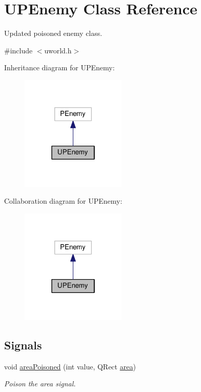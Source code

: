 \hypertarget{classUPEnemy}{}\section{U\+P\+Enemy Class Reference}
\label{classUPEnemy}


Updated poisoned enemy class.  




{\ttfamily \#include $<$uworld.\+h$>$}



Inheritance diagram for U\+P\+Enemy\+:
\nopagebreak
\begin{figure}[H]
\begin{center}
\leavevmode
\includegraphics[width=142pt]{da/dff/classUPEnemy__inherit__graph}
\end{center}
\end{figure}


Collaboration diagram for U\+P\+Enemy\+:
\nopagebreak
\begin{figure}[H]
\begin{center}
\leavevmode
\includegraphics[width=142pt]{d3/dfe/classUPEnemy__coll__graph}
\end{center}
\end{figure}
\subsection*{Signals}
\begin{DoxyCompactItemize}
\item 
void \hyperlink{classUPEnemy_ac021d11a175d2f07c2055a4c8aace52d}{area\+Poisoned} (int value, Q\+Rect \hyperlink{classUPEnemy_aa87ac038b30dccbad0a0966824d99382}{area})
\begin{DoxyCompactList}\small\item\em Poison the area signal. \end{DoxyCompactList}\end{DoxyCompactItemize}
